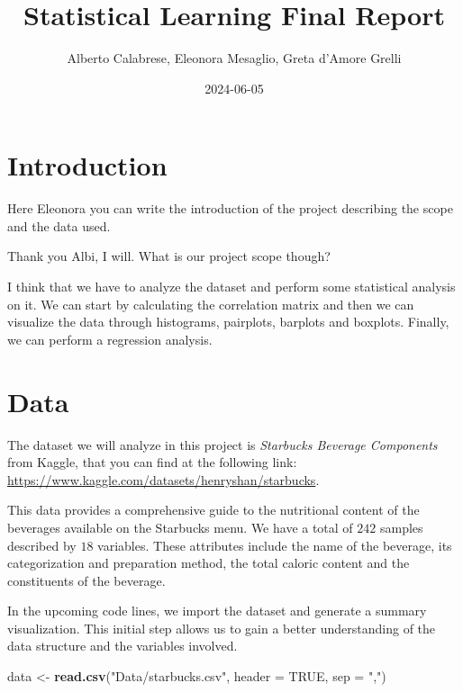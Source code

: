 \documentclass[
]{article}
\title{Statistical Learning Final Report}
\author{Alberto Calabrese, Eleonora Mesaglio, Greta d'Amore Grelli}
\date{2024-06-05}
\newenvironment{Shaded}{\begin{snugshade}}{\end{snugshade}}
\newcommand{\AttributeTok}[1]{\textcolor[rgb]{0.13,0.29,0.53}{#1}}
\newcommand{\ConstantTok}[1]{\textcolor[rgb]{0.56,0.35,0.01}{#1}}
\newcommand{\FunctionTok}[1]{\textcolor[rgb]{0.13,0.29,0.53}{\textbf{#1}}}
\newcommand{\NormalTok}[1]{#1}
\newcommand{\OtherTok}[1]{\textcolor[rgb]{0.56,0.35,0.01}{#1}}
\newcommand{\StringTok}[1]{\textcolor[rgb]{0.31,0.60,0.02}{#1}}
\begin{document}
\maketitle

{
\setcounter{tocdepth}{3}
\tableofcontents
}
\section{Introduction}\label{introduction}

Here Eleonora you can write the introduction of the project describing
the scope and the data used.

Thank you Albi, I will. What is our project scope though?

I think that we have to analyze the dataset and perform some statistical
analysis on it. We can start by calculating the correlation matrix and
then we can visualize the data through histograms, pairplots, barplots
and boxplots. Finally, we can perform a regression analysis.

\section{Data}\label{data}

The dataset we will analyze in this project is \emph{Starbucks Beverage
Components} from Kaggle, that you can find at the following link:
\url{https://www.kaggle.com/datasets/henryshan/starbucks}.

This data provides a comprehensive guide to the nutritional content of
the beverages available on the Starbucks menu. We have a total of
\(242\) samples described by \(18\) variables. These attributes include
the name of the beverage, its categorization and preparation method, the
total caloric content and the constituents of the beverage.

In the upcoming code lines, we import the dataset and generate a summary
visualization. This initial step allows us to gain a better
understanding of the data structure and the variables involved.

\begin{Shaded}
\begin{Highlighting}[]
\NormalTok{data }\OtherTok{\textless{}{-}} \FunctionTok{read.csv}\NormalTok{(}\StringTok{"Data/starbucks.csv"}\NormalTok{, }\AttributeTok{header =} \ConstantTok{TRUE}\NormalTok{, }\AttributeTok{sep =} \StringTok{","}\NormalTok{)}
\end{Highlighting}
\end{Shaded}
\end{document}
